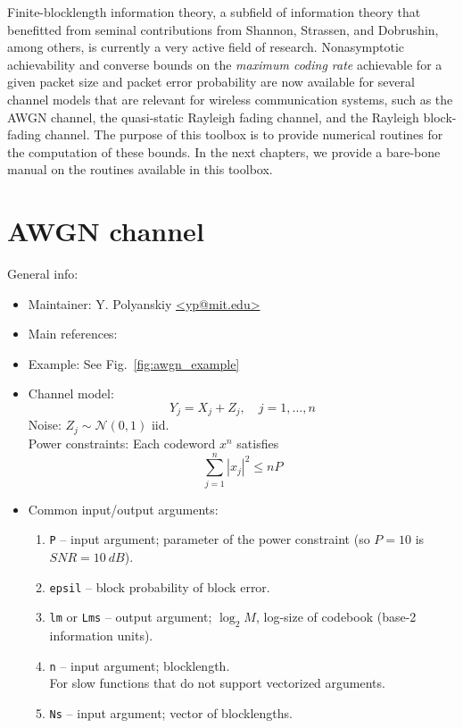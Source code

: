 \documentclass[a4paper,11p]{memoir}
\def\matn{\mathcal{N}}
\begin{document}
Finite-blocklength information theory, a subfield of information theory that benefitted from seminal contributions from Shannon, Strassen, and Dobrushin, among others, is currently a very active field of research. 
Nonasymptotic achievability and converse bounds on the \emph{maximum coding rate} achievable for a given packet size and packet error probability are now available for several channel models that are relevant for wireless communication systems, such as the AWGN channel, the quasi-static Rayleigh fading channel, and the Rayleigh block-fading channel.
The purpose of this toolbox is to provide numerical routines for the computation of these bounds.
In the next chapters, we provide a bare-bone manual on the routines available in this toolbox.



\chapter{AWGN channel}


General info:
\begin{itemize}
\item Maintainer: Y. Polyanskiy \url{<yp@mit.edu>}

\item Main references: \cite{PPV08,PPV10eneff}

\item Example: See Fig.~\ref{fig:awgn_example} 

\item Channel model:
	$$ Y_j = X_j + Z_j, \quad j=1,\ldots,n $$
	Noise: $Z_j \sim \matn(0,1)$ iid.\\
	Power constraints: Each codeword $x^n$ satisfies
			$$ \sum_{j=1}^n |x_j|^2 \le n P $$

\item Common input/output arguments:
\begin{enumerate}
\item \verb|P| -- input argument; parameter of the power constraint (so $P=10$ is $SNR=10~dB$).
\item \verb|epsil| -- block probability of block error.
\item \verb|lm| or \verb|Lms| -- output argument; $\log_2 M$, log-size of codebook (base-2 information units). 
\item \verb|n| -- input argument; blocklength.\\
		For slow functions that do not support vectorized arguments.
\item \verb|Ns| -- input argument; vector of blocklengths.
\end{enumerate}
\end{itemize}
\end{document}
